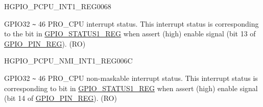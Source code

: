 \begin{register}{H}{GPIO\_PCPU\_INT1\_REG}{\hexprefix{}0068}\label{regdesc:GPIOPCPUINT1REG}
%
%
\regnewline%
\begin{regdesc}\begin{reglist}
\label{fielddesc:GPIOPROCPU1INT}\item [GPIO\_PROCPU1\_INT] GPIO32 \verb+~+ 46 PRO\_CPU interrupt status. This interrupt status is corresponding to the bit in \hyperref[regdesc:GPIOSTATUS1REG]{GPIO\_STATUS1\_REG} when assert (high) enable signal (bit 13 of \hyperref[regdesc:GPIOPINNREG]{GPIO\_PIN\_REG}). (RO)
\end{reglist}\end{regdesc}
\end{register}


\begin{register}{H}{GPIO\_PCPU\_NMI\_INT1\_REG}{\hexprefix{}006C}\label{regdesc:GPIOPCPUNMIINT1REG}
%
%
\regnewline%
\begin{regdesc}\begin{reglist}
\label{fielddesc:GPIOPROCPUNMI1INT}\item [GPIO\_PROCPU\_NMI1\_INT] GPIO32 \verb+~+ 46 PRO\_CPU non-maskable interrupt status. This interrupt status is corresponding to bit in \hyperref[regdesc:GPIOSTATUS1REG]{GPIO\_STATUS1\_REG} when assert (high) enable signal (bit 14 of \hyperref[regdesc:GPIOPINNREG]{GPIO\_PIN\_REG}). (RO)
\end{reglist}\end{regdesc}
\end{register}


